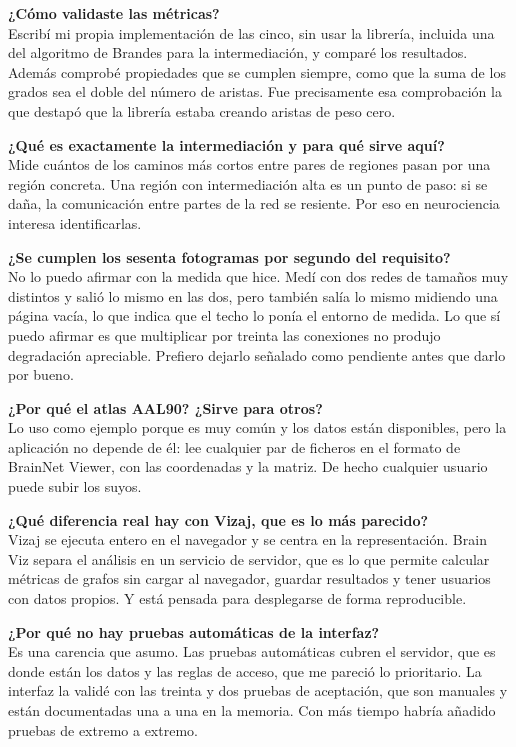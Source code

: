 \documentclass[12pt, a4paper]{article}
\begin{document}
\textbf{¿Cómo validaste las métricas?}\\
Escribí mi propia implementación de las cinco, sin usar la librería, incluida una del algoritmo de
Brandes para la intermediación, y comparé los resultados. Además comprobé propiedades que se cumplen
siempre, como que la suma de los grados sea el doble del número de aristas. Fue precisamente esa
comprobación la que destapó que la librería estaba creando aristas de peso cero.

\textbf{¿Qué es exactamente la intermediación y para qué sirve aquí?}\\
Mide cuántos de los caminos más cortos entre pares de regiones pasan por una región concreta. Una
región con intermediación alta es un punto de paso: si se daña, la comunicación entre partes de la
red se resiente. Por eso en neurociencia interesa identificarlas.

\textbf{¿Se cumplen los sesenta fotogramas por segundo del requisito?}\\
No lo puedo afirmar con la medida que hice. Medí con dos redes de tamaños muy distintos y salió lo
mismo en las dos, pero también salía lo mismo midiendo una página vacía, lo que indica que el techo
lo ponía el entorno de medida. Lo que sí puedo afirmar es que multiplicar por treinta las conexiones
no produjo degradación apreciable. Prefiero dejarlo señalado como pendiente antes que darlo por
bueno.

\textbf{¿Por qué el atlas AAL90? ¿Sirve para otros?}\\
Lo uso como ejemplo porque es muy común y los datos están disponibles, pero la aplicación no depende
de él: lee cualquier par de ficheros en el formato de BrainNet Viewer, con las coordenadas y la
matriz. De hecho cualquier usuario puede subir los suyos.

\textbf{¿Qué diferencia real hay con Vizaj, que es lo más parecido?}\\
Vizaj se ejecuta entero en el navegador y se centra en la representación. Brain Viz separa el
análisis en un servicio de servidor, que es lo que permite calcular métricas de grafos sin cargar al
navegador, guardar resultados y tener usuarios con datos propios. Y está pensada para desplegarse de
forma reproducible.

\textbf{¿Por qué no hay pruebas automáticas de la interfaz?}\\
Es una carencia que asumo. Las pruebas automáticas cubren el servidor, que es donde están los datos
y las reglas de acceso, que me pareció lo prioritario. La interfaz la validé con las treinta y dos
pruebas de aceptación, que son manuales y están documentadas una a una en la memoria. Con más tiempo
habría añadido pruebas de extremo a extremo.
\end{document}
